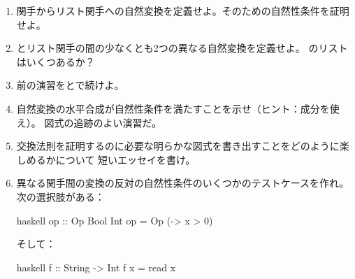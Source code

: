 \begin{enumerate}
  \tightlist
  \item
        関手からリスト関手への自然変換を定義せよ。そのための自然性条件を証明せよ。
  \item
        とリスト関手の間の少なくとも2つの異なる自然変換を定義せよ。
        \code{()}のリストはいくつあるか？
  \item
        前の演習をとで続けよ。
  \item
        自然変換の水平合成が自然性条件を満たすことを示せ（ヒント：成分を使え）。
        図式の追跡のよい演習だ。
  \item
        交換法則を証明するのに必要な明らかな図式を書き出すことをどのように楽しめるかについて
        短いエッセイを書け。
  \item
        異なる関手間の変換の反対の自然性条件のいくつかのテストケースを作れ。
        次の選択肢がある：

        \begin{snip}{haskell}
op :: Op Bool Int
op = Op (\x -> x > 0)
\end{snip}
        そして：

        \begin{snip}{haskell}
f :: String -> Int
f x = read x
\end{snip}
\end{enumerate}
